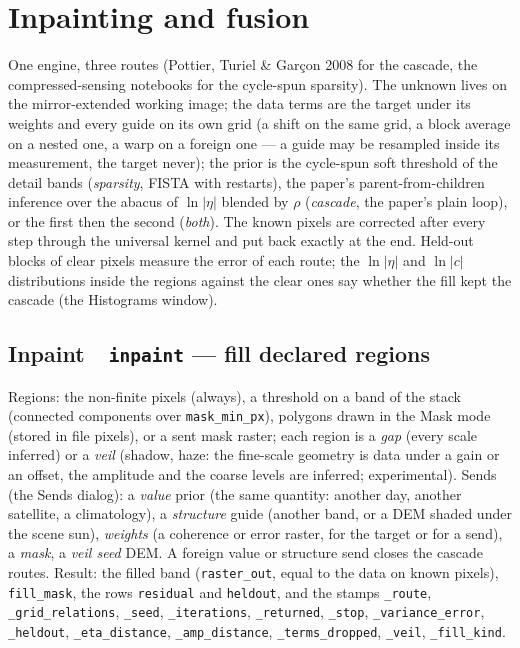 \documentclass[10pt]{article}
\newcommand{\dev}[1]{\texttt{#1}}
\newcommand{\tool}[2]{#1~\textperiodcentered~\dev{#2}}
\begin{document}
\section{Inpainting and fusion}\label{sec:inpaint}
One engine, three routes (Pottier, Turiel \& Gar\c{c}on 2008 for the cascade, the
compressed-sensing notebooks for the cycle-spun sparsity). The unknown lives on
the mirror-extended working image; the data terms are the target under its weights and every
guide on its own grid (a shift on the same grid, a block average on a nested one, a warp on a
foreign one --- a guide may be resampled inside its measurement, the target never); the prior
is the cycle-spun soft threshold of the detail bands (\emph{sparsity}, FISTA with restarts), the
paper's parent-from-children inference over the abacus of $\ln|\eta|$ blended by $\rho$
(\emph{cascade}, the paper's plain loop), or the first then the second (\emph{both}). The
known pixels are corrected after every step through the universal kernel and put back exactly
at the end. Held-out blocks of clear pixels measure the error of each route; the $\ln|\eta|$
and $\ln|c|$ distributions inside the regions against the clear ones say whether the fill kept
the cascade (the Histograms window).

\subsection{\tool{Inpaint}{inpaint} --- fill declared regions}
Regions: the non-finite pixels (always), a threshold on a band of the stack (connected
components over \texttt{mask\_min\_px}), polygons drawn in the Mask mode (stored in file
pixels), or a sent mask raster; each region is a \emph{gap} (every scale inferred) or a
\emph{veil} (shadow, haze: the fine-scale geometry is data under a gain or an offset, the
amplitude and the coarse levels are inferred; experimental). Sends (the Sends dialog): a
\emph{value} prior (the same quantity: another day, another satellite, a climatology), a
\emph{structure} guide (another band, or a DEM shaded under the scene sun), \emph{weights} (a
coherence or error raster, for the target or for a send), a \emph{mask}, a \emph{veil seed}
DEM. A foreign value or structure send closes the cascade routes. Result: the filled band
(\texttt{raster\_out}, equal to the data on known pixels), \texttt{fill\_mask}, the rows
\texttt{residual} and \texttt{heldout}, and the stamps \texttt{\_route},
\texttt{\_grid\_relations}, \texttt{\_seed}, \texttt{\_iterations}, \texttt{\_returned},
\texttt{\_stop}, \texttt{\_variance\_error}, \texttt{\_heldout}, \texttt{\_eta\_distance},
\texttt{\_amp\_distance}, \texttt{\_terms\_dropped}, \texttt{\_veil}, \texttt{\_fill\_kind}.
\end{document}
